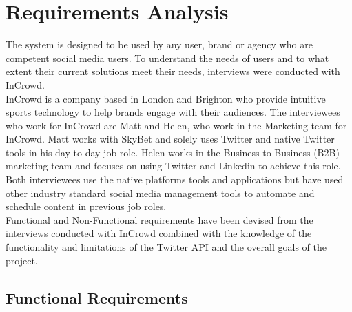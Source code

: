 \chapter{Requirements Analysis}

The system is designed to be used by any user, brand or agency who are competent social media users. To understand the needs of users and to what extent their current solutions meet their needs, interviews were conducted with InCrowd. \\

InCrowd is a company based in London and Brighton who provide intuitive sports technology to help brands engage with their audiences. The interviewees who work for InCrowd are Matt and Helen, who work in the Marketing team for InCrowd. Matt works with SkyBet and solely uses Twitter and native Twitter tools in his day to day job role. Helen works in the Business to Business (B2B) marketing team and focuses on using Twitter and Linkedin to achieve this role. Both interviewees use the native platforms tools and applications but have used other industry standard social media management tools to automate and schedule content in previous job roles. \\

Functional and Non-Functional requirements have been devised from the interviews conducted with InCrowd combined with the knowledge of the functionality and limitations of the Twitter API and the overall goals of the project. 

\section{Functional Requirements}

